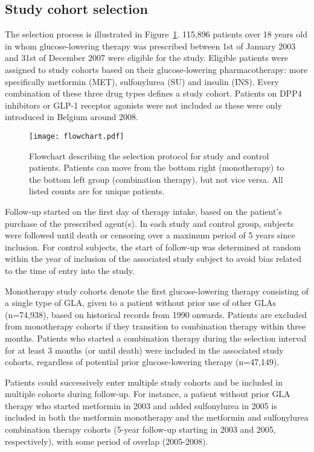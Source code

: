 \subsection{Study cohort selection}
The selection process is illustrated in Figure~\ref{fig:survival-selection}. 115,896 patients over 18 years old in whom glucose-lowering therapy was prescribed between 1st of January 2003 and 31st of December 2007 were eligible for the study. Eligible patients were assigned to study cohorts based on their glucose-lowering pharmacotherapy: more specifically metformin (MET), sulfonylurea (SU) and insulin (INS). Every combination of these three drug types defines a study cohort. Patients on DPP4 inhibitors or GLP-1 receptor agonists were not included as these were only introduced in Belgium around 2008. 

\begin{figure}[!p]
  \centering 
      \texttt{[image: flowchart.pdf]} 
  \caption{Flowchart describing the selection protocol for study and control patients. Patients can move
from the bottom right (monotherapy) to the bottom left group (combination therapy), but not vice
versa. All listed counts are for unique patients.}\label{fig:survival-selection}
\end{figure}

Follow-up started on the first day of therapy intake, based on the patient's purchase of the prescribed agent(s). In each study and control group, subjects were followed until death or censoring over a maximum period of 5 years since inclusion. For control subjects, the start of follow-up was determined at random within the year of inclusion of the associated study subject to avoid bias related to the time of entry into the study.

Monotherapy study cohorts denote the first glucose-lowering therapy consisting of a single type of GLA, given to a patient without prior use of other GLAs (n=74,938), based on historical records from 1990 onwards. Patients are excluded from monotherapy cohorts if they transition to combination therapy within three months. Patients who started a combination therapy during the selection interval for at least 3 months (or until death) were included in the associated study cohorts, regardless of potential prior glucose-lowering therapy (n=47,149). 

Patients could successively enter multiple study cohorts and be included in multiple cohorts during follow-up. For instance, a patient without prior GLA therapy who started metformin in 2003 and added sulfonylurea in 2005 is included in both the metformin monotherapy and the metformin and sulfonylurea combination therapy cohorts (5-year follow-up starting in 2003 and 2005, respectively), with some period of overlap (2005-2008).  

